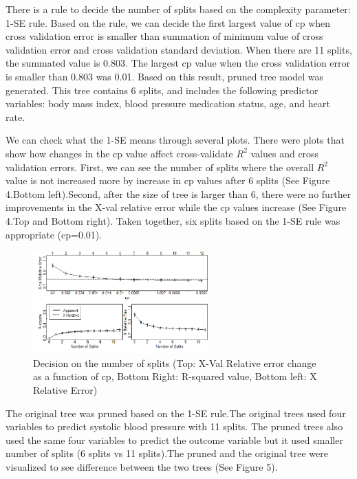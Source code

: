 \documentclass{article}\usepackage[]{graphicx}\usepackage[]{color}
\begin{document}
  There is a rule to decide the number of splits based on the complexity parameter: 1-SE rule. Based on the rule, we can decide the first largest value of cp when cross validation error is smaller than summation of minimum value of cross validation error and cross validation standard deviation. When there are 11 splits, the summated value is 0.803. The largest cp value when the  cross validation error is smaller than 0.803 was 0.01. Based on this result, pruned tree model was generated. This tree contains 6 splits, and includes the following predictor variables: body mass index, blood pressure medication status, age, and heart rate.
  
We can check what the 1-SE means through several plots. There were plots that show how changes in the cp value affect cross-validate $R^2$ values and cross validation errors. First, we can see the number of splits where the overall $R^2$ value is not increased more by increase in cp values after 6 splits (See Figure 4.Bottom left).Second, after the size of tree is larger than 6, there were no further improvements in the X-val relative error while the cp values increase (See Figure 4.Top and Bottom right). Taken together, six splits based on the 1-SE rule was appropriate (cp=0.01). 
  
\begin{figure}[h]
\begin{center}
    \centering
    \includegraphics[width=0.6\textwidth]{Validation.png}
    \caption{Decision on the number of splits (Top: X-Val Relative error change as a function of cp, Bottom Right: R-squared value, Bottom left: X Relative Error)}
    \label{Figure 1.}
\end{center}
\end{figure}






  The original tree was pruned based on the 1-SE rule.The original trees used four variables to predict systolic blood pressure with 11 splits. The pruned trees also used the same four variables to predict the outcome variable but it used smaller number of splits (6 splits vs 11 splits).The pruned and the original tree were visualized to see difference between the two trees (See Figure 5).
  
\end{document}
